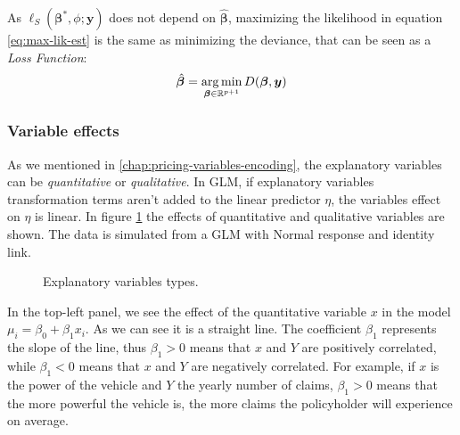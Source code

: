 \documentclass[a4paper, nobind]{templates/ociamthesis}
\theoremstyle{definition}
\theoremstyle{definition}
\theoremstyle{definition}
\theoremstyle{remark}
\begin{document}
As \(\ell_{S}\left(\boldsymbol{\beta}^*, \phi; \boldsymbol{y}\right)\) does not depend on \(\hat{\boldsymbol{\beta}}\), maximizing the likelihood in equation \eqref{eq:max-lik-est} is the same as minimizing the deviance, that can be seen as a \emph{Loss Function}:
\begin{equation}
\label{eq:max-lik-est-deviance}
\hat{\boldsymbol{\beta}} = \operatorname*{arg\,min}_{\boldsymbol{\beta}\in\mathbb{R}^{p+1}}{D(\boldsymbol{\beta}, \boldsymbol{y})}
\end{equation}

\hypertarget{chap:var-effects}{%
\subsubsection{Variable effects}\label{chap:var-effects}}

As we mentioned in \ref{chap:pricing-variables-encoding}, the explanatory variables can be \emph{quantitative} or \emph{qualitative}. In GLM, if explanatory variables transformation terms aren't added to the linear predictor \(\eta\), the variables effect on \(\eta\) is linear. In figure \ref{fig:expl-var-types} the effects of quantitative and qualitative variables are shown. The data is simulated from a GLM with Normal response and identity link.





\begin{figure}[!hbtp]

{\centering {}\newline{}

}

\caption{Explanatory variables types.}\label{fig:expl-var-types}
\end{figure}

In the top-left panel, we see the effect of the quantitative variable \(x\) in the model \(\mu_i = \beta_0 + \beta_1 x_i\). As we can see it is a straight line. The coefficient \(\beta_1\) represents the slope of the line, thus \(\beta_1>0\) means that \(x\) and \(Y\) are positively correlated, while \(\beta_1<0\) means that \(x\) and \(Y\) are negatively correlated. For example, if \(x\) is the power of the vehicle and \(Y\) the yearly number of claims, \(\beta_1>0\) means that the more powerful the vehicle is, the more claims the policyholder will experience on average.
\end{document}
